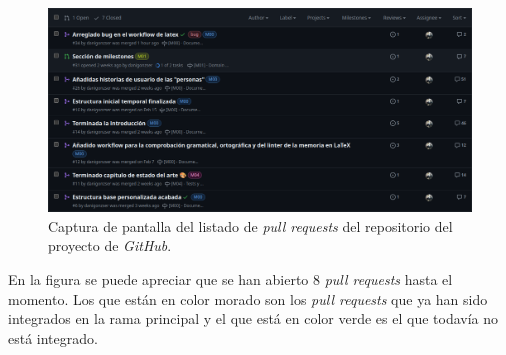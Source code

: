 \begin{figure}[H]
    \caption{Captura de pantalla del listado de \textit{pull requests} del repositorio del proyecto de \textit{GitHub}.}
    \centering
    \vspace*{0.5cm}
    \includegraphics[scale=0.2]{figuras/listado_pull_requests_github.png}
\end{figure}

En la figura se puede apreciar que se han abierto 8 \textit{pull requests} hasta el momento. Los que están en color morado son los \textit{pull requests} que ya han sido integrados en la rama principal y el que está en color verde es el que todavía no está integrado.

